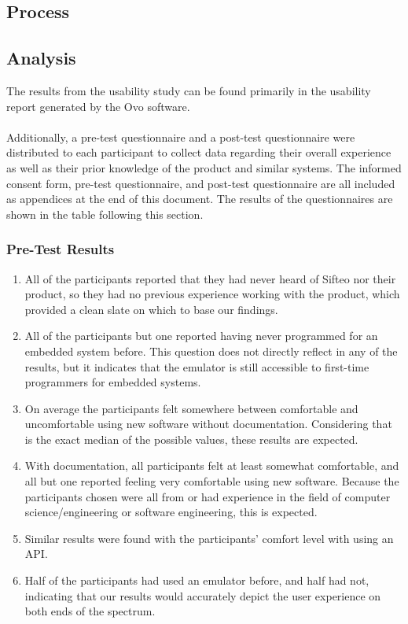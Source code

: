 \documentclass[12pt]{article}
\begin{document}
\subsection{Process}


\subsection{Analysis}
The results from the usability study can be found primarily in the usability report generated by the Ovo software. \\\\
Additionally, a pre-test questionnaire and a post-test questionnaire were distributed to each participant to collect data regarding their overall experience as well as their prior knowledge of the product and similar systems. The informed consent form, pre-test questionnaire, and post-test questionnaire are all included as appendices at the end of this document. The results of the questionnaires are shown in the table following this section.
\subsubsection{Pre-Test Results}
\begin{enumerate}
        \item{All of the participants reported that they had never heard of Sifteo nor their product, so they had no previous experience working with the product, which provided a clean slate on which to base our findings.}
        \item{All of the participants but one reported having never programmed for an embedded system before. This question does not directly reflect in any of the results, but it indicates that the emulator is still accessible to first-time programmers for embedded systems.}
        \item{On average the participants felt somewhere between comfortable and uncomfortable using new software without documentation.  Considering that is the exact median of the possible values, these results are expected.}
        \item{With documentation, all participants felt at least somewhat comfortable, and all but one reported feeling very comfortable using new software. Because the participants chosen were all from or had experience in the field of computer science/engineering or software engineering, this is expected.}
        \item{Similar results were found with the participants' comfort level with using an API.}
        \item{Half of the participants had used an emulator before, and half had not, indicating that our results would accurately depict the user experience on both ends of the spectrum.}
\end{enumerate}
\end{document}
